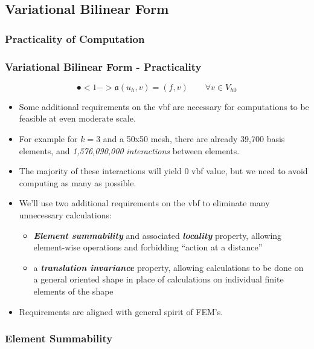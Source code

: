 \documentclass[compress]{beamer}
\begin{document}
\subsection{Variational Bilinear Form}

\subsubsection{Practicality of Computation}

\begin{frame}
  \frametitle{Variational Bilinear Form - Practicality}
  $$\spot<1->{\mathfrak{a}}(u_h,v) = (f,v)\quad\quad \forall{v} \in V_{h0}$$
  \begin{itemize}[<+->]
    \item Some additional requirements on the vbf are necessary for computations to be feasible at even moderate scale.
    \item For example for $k=3$ and a 50x50 mesh, there are already 39,700 basis elements, and \emph{1,576,090,000} 
      \emph{interactions} between elements. 
    \item The majority of these interactions will yield $0$ vbf value, but we need to avoid computing as many as possible.
    \item We'll use two additional requirements on the vbf to eliminate many unnecessary calculations:
        \begin{itemize}[<+->]
          \item \emph{\textbf{Element summability}} and associated \emph{\textbf{locality}} property, allowing element-wise operations and
            forbidding ``action at a distance''
          \item a \emph{\textbf{translation invariance}} property, allowing calculations to be done on a general oriented shape in place of
            calculations on individual finite elements of the shape
        \end{itemize}
    \item Requirements are aligned with general spirit of FEM's.
  \end{itemize}
\end{frame}

\subsubsection{Element Summability}
\end{document}
